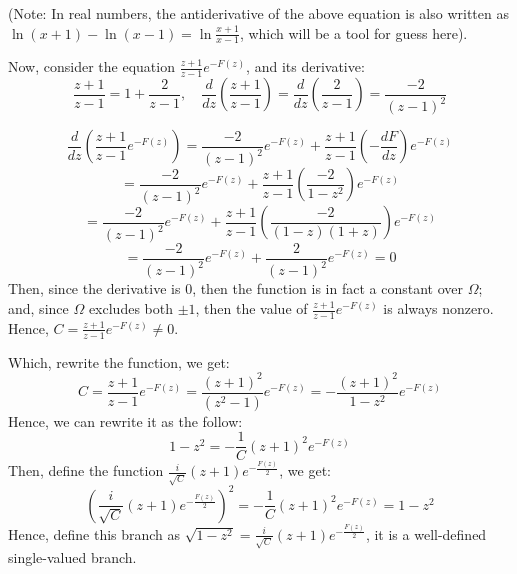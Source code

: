 \documentclass{article}
\begin{document}
(Note: In real numbers, the antiderivative of the above equation is also written as $\ln(x+1)-\ln(x-1)=\ln\frac{x+1}{x-1}$, which will be a tool for guess here).

\hfil

Now, consider the equation $\frac{z+1}{z-1}e^{-F(z)}$, and its derivative:
$$\frac{z+1}{z-1}=1+\frac{2}{z-1},\quad \frac{d}{dz}\left(\frac{z+1}{z-1}\right)=\frac{d}{dz}\left(\frac{2}{z-1}\right) = \frac{-2}{(z-1)^2}$$

$$\frac{d}{dz}\left(\frac{z+1}{z-1}e^{-F(z)}\right) = \frac{-2}{(z-1)^2}e^{-F(z)}+\frac{z+1}{z-1}\left(-\frac{dF}{dz}\right)e^{-F(z)}$$
$$= \frac{-2}{(z-1)^2}e^{-F(z)}+\frac{z+1}{z-1}\left(\frac{-2}{1-z^2}\right)e^{-F(z)}$$
$$= \frac{-2}{(z-1)^2}e^{-F(z)}+\frac{z+1}{z-1}\left(\frac{-2}{(1-z)(1+z)}\right)e^{-F(z)}$$
$$= \frac{-2}{(z-1)^2}e^{-F(z)}+\frac{2}{(z-1)^2}e^{-F(z)} = 0$$
Then, since the derivative is $0$, then the function is in fact a constant over $\Omega$; and, since $\Omega$ excludes both $\pm 1$, then the value of $\frac{z+1}{z-1}e^{-F(z)}$ is always nonzero.
Hence, $C=\frac{z+1}{z-1}e^{-F(z)}\neq 0$.

Which, rewrite the function, we get:
$$C=\frac{z+1}{z-1}e^{-F(z)} = \frac{(z+1)^2}{(z^2-1)}e^{-F(z)} = -\frac{(z+1)^2}{1-z^2}e^{-F(z)}$$
Hence, we can rewrite it as the follow:
$$1-z^2 = -\frac{1}{C}(z+1)^2e^{-F(z)}$$
Then, define the function $\frac{i}{\sqrt{C}}(z+1)e^{-\frac{F(z)}{2}}$, we get:
$$\left(\frac{i}{\sqrt{C}}(z+1)e^{-\frac{F(z)}{2}}\right)^2 = -\frac{1}{C}(z+1)^2e^{-F(z)} = 1-z^2$$
Hence, define this branch as $\sqrt{1-z^2}=\frac{i}{\sqrt{C}}(z+1)e^{-\frac{F(z)}{2}}$, it is a well-defined single-valued branch.

\hfil
\end{document}

